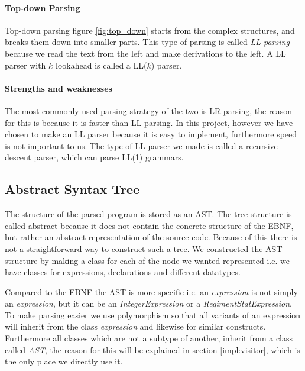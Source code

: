 	\paragraph{Top-down Parsing}
		Top-down parsing figure \ref{fig:top_down} starts from the complex structures, and breaks them down into smaller parts.
		This type of parsing is called {\it LL parsing} because we read the text from the left and make derivations to the left.
		A LL parser with $k$ lookahead is called a LL($k$) parser.
	\paragraph{Strengths and weaknesses}
		The most commonly used parsing strategy of the two is LR parsing, the reason for this is because it is faster than LL parsing.
		In this project, however we have chosen to make an LL parser because it is easy to implement, furthermore speed is not important to us. 
		The type of LL parser we made is called a recursive descent parser, which can parse LL(1) grammars.
		
	\subsection{Abstract Syntax Tree}\label{ast}
		The structure of the parsed program is stored as an AST. The tree structure is called abstract because it does not contain the concrete
		structure of the EBNF, but rather an abstract representation of the source code. Because of this there is not a straightforward way to 
		construct such a tree.  We constructed the AST-structure by making a class for each of the node we wanted represented i.e. we have 
		classes for expressions, declarations and different datatypes.
		
		Compared to the EBNF the AST is more specific i.e. an \textit{expression} 
		is not simply an \textit{expression}, but it can be an {\it IntegerExpression} or a {\it RegimentStatExpression}. 
		To make parsing easier we use polymorphism so that all variants of an expression 
		will inherit from the class \textit{expression} and likewise for similar constructs. 
		Furthermore all classes which are not a subtype of another, inherit from a class called {\it AST}, 
		the reason for this will be explained in section \ref{impl:visitor}, which is the only place we directly use it.
		
